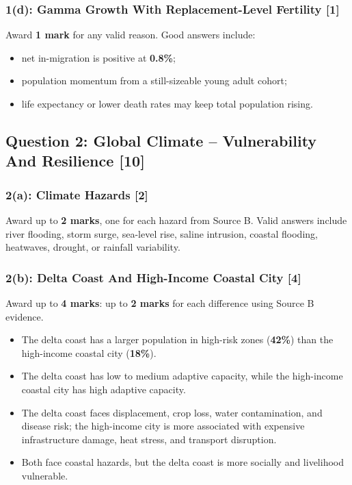 \documentclass[11pt,a4paper]{article}
\newcommand{\term}[1]{\textcolor{HeadingBlue}{\textbf{#1}}}
\newcommand{\score}[1]{\textcolor{AccentTeal}{\textbf{#1}}}
\begin{document}
\subsubsection{1(d): Gamma Growth With Replacement-Level Fertility [1]}

Award \score{1 mark} for any valid reason. Good answers include:

\begin{itemize}
  \item net in-migration is positive at \term{0.8\%};
  \item population momentum from a still-sizeable young adult cohort;
  \item life expectancy or lower death rates may keep total population rising.
\end{itemize}

\subsection{Question 2: Global Climate -- Vulnerability And Resilience [10]}

\subsubsection{2(a): Climate Hazards [2]}

Award up to \score{2 marks}, one for each hazard from Source B. Valid answers
include river flooding, storm surge, sea-level rise, saline intrusion, coastal
flooding, heatwaves, drought, or rainfall variability.

\subsubsection{2(b): Delta Coast And High-Income Coastal City [4]}

Award up to \score{4 marks}: up to \score{2 marks} for each difference using
Source B evidence.

\begin{itemize}
  \item The delta coast has a larger population in high-risk zones
  (\term{42\%}) than the high-income coastal city (\term{18\%}).
  \item The delta coast has low to medium adaptive capacity, while the
  high-income coastal city has high adaptive capacity.
  \item The delta coast faces displacement, crop loss, water contamination, and
  disease risk; the high-income city is more associated with expensive
  infrastructure damage, heat stress, and transport disruption.
  \item Both face coastal hazards, but the delta coast is more socially and
  livelihood vulnerable.
\end{itemize}
\end{document}
